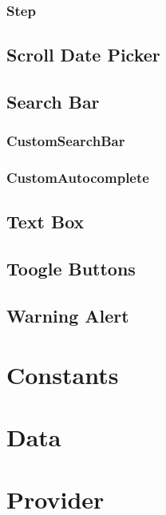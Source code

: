 \subsubsection*{Step}
\label{subsubsec:step}

\subsection{Scroll Date Picker}
\label{subsec:scroll-date-picker}

\subsection{Search Bar}
\label{subsec:search-bar}

\subsubsection*{CustomSearchBar}
\label{subsubsec:custom-search-bar}

\subsubsection*{CustomAutocomplete}
\label{subsubsec:custom-autocomplete}

\subsection{Text Box}
\label{subsec:text-box}

\subsection{Toogle Buttons}
\label{subsec:toogle-buttons}

\subsection{Warning Alert}
\label{subsec:warning-alert}

\section{Constants}
\label{sec:constants}

\section{Data}
\label{sec:data}

\section{Provider}
\label{sec:provider}

